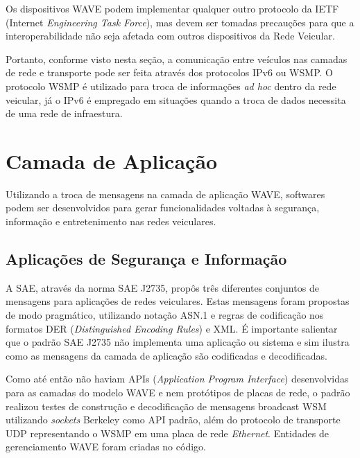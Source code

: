 \documentclass[
12pt,				%
openright,			%
oneside,			%
a4paper,			%
brazil,				%
]{abntex2}
\begin{document}
	\par Os dispositivos WAVE podem implementar qualquer outro protocolo da IETF (Internet \textit{Engineering Task Force}), mas devem ser tomadas precauções para que a interoperabilidade não seja afetada com outros dispositivos da Rede Veicular.
	
	\par Portanto, conforme visto nesta seção, a comunicação entre veículos nas camadas de rede e transporte pode ser feita através dos protocolos IPv6 ou WSMP. O protocolo WSMP é utilizado para troca de informações \textit{ad hoc} dentro da rede veicular, já o IPv6 é empregado em situações quando a troca de dados necessita de uma rede de infraestura.
	
	\section{Camada de Aplicação}
	
	\par Utilizando a troca de mensagens na camada de aplicação WAVE, softwares podem ser desenvolvidos para gerar funcionalidades voltadas à segurança, informação e entretenimento nas redes veiculares.
	
	\subsection{Aplicações de Segurança e Informação}
	
	\par A SAE, através da norma SAE J2735, propôs três diferentes conjuntos de mensagens para aplicações de redes veiculares. Estas mensagens foram propostas de modo pragmático, utilizando notação ASN.1 e regras de codificação nos formatos DER (\textit{Distinguished Encoding Rules}) e XML. É importante salientar que o padrão SAE J2735 não implementa uma aplicação ou sistema e sim ilustra como as mensagens da camada de aplicação são codificadas e decodificadas.
	
	\par Como até então não haviam APIs (\textit{Application Program Interface}) desenvolvidas para as camadas do modelo WAVE e nem protótipos de placas de rede, o padrão realizou testes de construção e decodificação de mensagens broadcast WSM utilizando \textit{sockets} Berkeley como API padrão, além do protocolo de transporte UDP representando o WSMP em uma placa de rede \textit{Ethernet}. Entidades de gerenciamento WAVE foram criadas no código.
	
\end{document}
